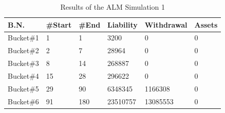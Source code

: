 \begin{table}[h!]
\caption{Results of the ALM Simulation 1}
\label{tab:Results of the ALM Simulation 1}
\begin{tabular}{llllll}
\hline
\multicolumn{1}{|l|}{B.N.}                                 & \multicolumn{1}{l|}{\#Start}                           & \multicolumn{1}{l|}{\#End}                           & \multicolumn{1}{l|}{Liability}                           & \multicolumn{1}{l|}{Withdrawal}                          & \multicolumn{1}{l|}{Assets}                            \\ \hline
\multicolumn{1}{|l|}{Bucket\#1}                            & \multicolumn{1}{l|}{1}                                 & \multicolumn{1}{l|}{1}                               & \multicolumn{1}{l|}{3200}                                & \multicolumn{1}{l|}{0}                                   & \multicolumn{1}{l|}{0}                                 \\ \hline
\multicolumn{1}{|l|}{Bucket\#2}                            & \multicolumn{1}{l|}{2}                                 & \multicolumn{1}{l|}{7}                               & \multicolumn{1}{l|}{28964}                               & \multicolumn{1}{l|}{0}                                   & \multicolumn{1}{l|}{0}                                 \\ \hline
\multicolumn{1}{|l|}{Bucket\#3}                            & \multicolumn{1}{l|}{8}                                 & \multicolumn{1}{l|}{14}                              & \multicolumn{1}{l|}{268887}                              & \multicolumn{1}{l|}{0}                                   & \multicolumn{1}{l|}{0}                                 \\ \hline
\multicolumn{1}{|l|}{Bucket\#4}                            & \multicolumn{1}{l|}{15}                                & \multicolumn{1}{l|}{28}                              & \multicolumn{1}{l|}{296622}                              & \multicolumn{1}{l|}{0}                                   & \multicolumn{1}{l|}{0}                                 \\ \hline
\multicolumn{1}{|l|}{Bucket\#5}                            & \multicolumn{1}{l|}{29}                                & \multicolumn{1}{l|}{90}                              & \multicolumn{1}{l|}{6348345}                             & \multicolumn{1}{l|}{1166308}                             & \multicolumn{1}{l|}{0}                                 \\ \hline
\multicolumn{1}{|l|}{Bucket\#6}                            & \multicolumn{1}{l|}{91}                                & \multicolumn{1}{l|}{180}                             & \multicolumn{1}{l|}{23510757}                            & \multicolumn{1}{l|}{13085553}                            & \multicolumn{1}{l|}{0}                                 \\ \hline

\end{tabular}
\end{table}

